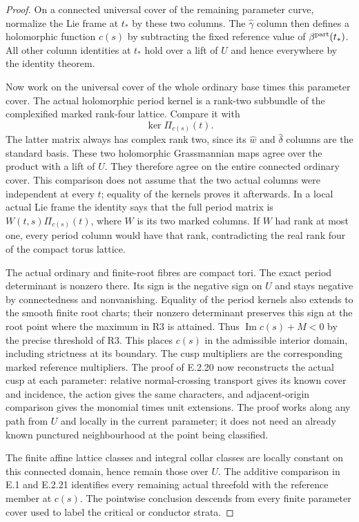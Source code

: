 \begin{proof}
On a connected universal cover of
the remaining parameter curve, normalize
the Lie frame at $t_*$ by these two
columns.  The $\widehat\gamma$ column
then defines a holomorphic function
$c(s)$ by subtracting the fixed
reference value of $\beta^{\rm part}(t_*)$.
All other column identities at $t_*$
hold over a lift of $U$ and hence
everywhere by the identity theorem.

Now work on the universal cover of
the whole ordinary base times this
parameter cover.  The actual holomorphic
period kernel is a rank-two subbundle
of the complexified marked rank-four
lattice.  Compare it with
\[
 \ker\Pi_{c(s)}(t).
 \tag{E.2.22.5}
\]
The latter matrix always has complex
rank two, since its $\widehat w$ and
$\widehat\delta$ columns are the
standard basis.  These two holomorphic
Grassmannian maps agree over the
product with a lift of $U$.  They
therefore agree on the entire
connected ordinary cover.
This comparison does not assume
that the two actual columns were
independent at every $t$; equality
of the kernels proves it afterwards.
In a local actual Lie frame the
identity says that the full period
matrix is $W(t,s)\Pi_{c(s)}(t)$,
where $W$ is its two marked columns.
If $W$ had rank at most one, every
period column would have that rank,
contradicting the real rank four
of the compact torus lattice.

The actual ordinary and finite-root
fibres are compact tori.  The exact
period determinant is nonzero there.
Its sign is the negative sign on
$U$ and stays negative by connectedness
and nonvanishing.  Equality of the
period kernels also extends to the
smooth finite root charts; their
nonzero determinant preserves this
sign at the root point where the
maximum in R3 is attained.  Thus
$\operatorname{Im}c(s)+M<0$ by
the precise threshold of R3.
This places $c(s)$ in the
admissible interior domain, including
strictness at its boundary.  The
cusp multipliers are the corresponding
marked reference multipliers.  The
proof of E.2.20 now reconstructs
the actual cusp at each parameter:
relative normal-crossing transport
gives its known cover and incidence,
the action gives the same characters,
and adjacent-origin comparison gives
the monomial times unit extensions.
The proof works along any path from
$U$ and locally in the current
parameter; it does not need an
already known punctured neighbourhood
at the point being classified.

The finite affine lattice classes
and integral collar classes are
locally constant on this connected
domain, hence remain those over
$U$.  The additive comparison in
E.1 and E.2.21 identifies every
remaining actual threefold with
the reference member at $c(s)$.
The pointwise conclusion descends
from every finite parameter cover
used to label the critical or
conductor strata.


\end{proof}
